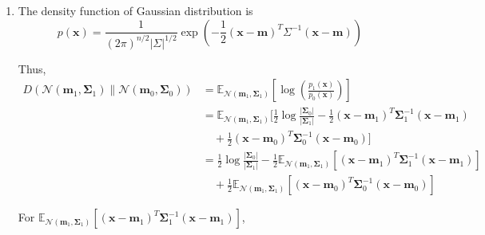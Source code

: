 \documentclass[a4paper]{article}
\begin{document}
\begin{enumerate}
    \item The density function of Gaussian distribution is 
    \begin{equation}
      p(\mathbf{x})=\frac{1}{(2 \pi)^{n / 2}|\Sigma|^{1 / 2}} \exp \left(-\frac{1}{2}(\mathbf{x}-\boldsymbol{m})^{T} \Sigma^{-1}(\mathbf{x}-\boldsymbol{m})\right)
    \end{equation}

    Thus, 
    \begin{equation}
      \begin{aligned}
        D\left(\mathcal{N}\left(\boldsymbol{m}_{1}, \boldsymbol{\Sigma}_{1}\right) \| \mathcal{N}\left(\boldsymbol{m}_{0}, \boldsymbol{\Sigma}_{0}\right)\right) & = \mathbb{E}_{\mathcal{N}\left(\boldsymbol{m}_{1}, \boldsymbol{\Sigma}_{1}\right)}[\log \left( \frac {p_1(\mathbf{x})}{p_0(\mathbf{x})}\right)] \\
        & =\mathbb{E}_{\mathcal{N}\left(\boldsymbol{m}_{1}, \boldsymbol{\Sigma}_{1}\right)}\Bigg[\frac{1}{2} \log \frac{\left|\boldsymbol{\Sigma}_{0}\right|}{\left|\boldsymbol{\Sigma}_{1}\right|}-\frac{1}{2}\left(\mathbf{x}-\boldsymbol{m}_{1}\right)^{T} \boldsymbol{\Sigma}_{1}^{-1}\left(\mathbf{x}-\boldsymbol{m}_{1}\right)\\ 
        &\quad+\frac{1}{2}\left(\mathbf{x}-\boldsymbol{m}_{0}\right)^{T} \boldsymbol{\Sigma}_{0}^{-1}\left(\mathbf{x}-\boldsymbol{m}_{0}\right)\Bigg] \\ 
        & =\frac{1}{2} \log \frac{\left|\boldsymbol{\Sigma}_{0}\right|}{\left|\boldsymbol{\Sigma}_{1}\right|}-\frac{1}{2} \mathbb{E}_{\mathcal{N}\left(\boldsymbol{m}_{1}, \boldsymbol{\Sigma}_{1}\right)}\left[\left(\mathbf{x}-\boldsymbol{m}_{1}\right)^{T} \boldsymbol{\Sigma}_{1}^{-1}\left(\mathbf{x}-\boldsymbol{m}_{1}\right)\right] \\
        & \quad +\frac{1}{2} \mathbb{E}_{\mathcal{N}\left(\boldsymbol{m}_{1}, \boldsymbol{\Sigma}_{1}\right)}\left[\left(\mathbf{x}-\boldsymbol{m}_{0}\right)^{T} \boldsymbol{\Sigma}_{0}^{-1}\left(\mathbf{x}-\boldsymbol{m}_{0}\right)\right]
      \end{aligned}
    \end{equation}

    For $\mathbb{E}_{\mathcal{N}\left(\boldsymbol{m}_{1}, \boldsymbol{\Sigma}_{1}\right)}\left[\left(\mathbf{x}-\boldsymbol{m}_{1}\right)^{T} \boldsymbol{\Sigma}_{1}^{-1}\left(\mathbf{x}-\boldsymbol{m}_{1}\right)\right]$,


\end{enumerate}
\end{document}
